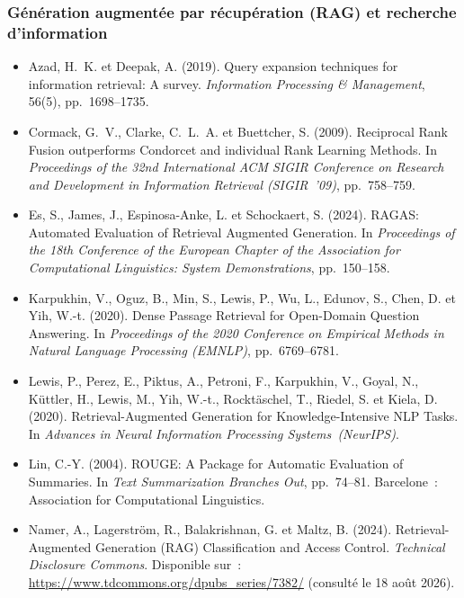 \documentclass[12pt,a4paper]{report}
\begin{document}
\subsubsection*{Génération augmentée par récupération (RAG) et recherche d'information}
\begin{itemize}[leftmargin=1.5em, itemsep=0.6em, label={}]
  \item\label{ref:azad2019} Azad, H.~K. et Deepak, A. (2019). Query expansion techniques for information retrieval: A survey. \textit{Information Processing \& Management}, 56(5), pp.~1698--1735.

  \item\label{ref:cormack2009} Cormack, G.~V., Clarke, C.~L.~A. et Buettcher, S. (2009). Reciprocal Rank Fusion outperforms Condorcet and individual Rank Learning Methods. In \textit{Proceedings of the 32nd International ACM SIGIR Conference on Research and Development in Information Retrieval (SIGIR~'09)}, pp.~758--759.

  \item\label{ref:es2024} Es, S., James, J., Espinosa-Anke, L. et Schockaert, S. (2024). RAGAS: Automated Evaluation of Retrieval Augmented Generation. In \textit{Proceedings of the 18th Conference of the European Chapter of the Association for Computational Linguistics: System Demonstrations}, pp.~150--158.

  \item\label{ref:karpukhin2020} Karpukhin, V., Oguz, B., Min, S., Lewis, P., Wu, L., Edunov, S., Chen, D. et Yih, W.-t. (2020). Dense Passage Retrieval for Open-Domain Question Answering. In \textit{Proceedings of the 2020 Conference on Empirical Methods in Natural Language Processing (EMNLP)}, pp.~6769--6781.

  \item\label{ref:lewis2020} Lewis, P., Perez, E., Piktus, A., Petroni, F., Karpukhin, V., Goyal, N., Küttler, H., Lewis, M., Yih, W.-t., Rocktäschel, T., Riedel, S. et Kiela, D. (2020). Retrieval-Augmented Generation for Knowledge-Intensive NLP Tasks. In \textit{Advances in Neural Information Processing Systems~(NeurIPS)}.

  \item\label{ref:lin2004} Lin, C.-Y. (2004). ROUGE: A Package for Automatic Evaluation of Summaries. In \textit{Text Summarization Branches Out}, pp.~74--81. Barcelone~: Association for Computational Linguistics.

  \item\label{ref:namer2024} Namer, A., Lagerström, R., Balakrishnan, G. et Maltz, B. (2024). Retrieval-Augmented Generation (RAG) Classification and Access Control. \textit{Technical Disclosure Commons}. Disponible sur~: \url{https://www.tdcommons.org/dpubs_series/7382/} (consulté le 18 août 2026).
\end{itemize}
\end{document}
